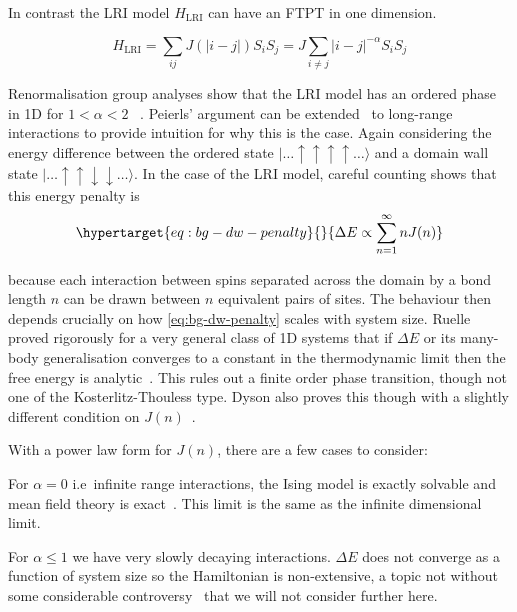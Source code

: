 In contrast the LRI model \(H_{\mathrm{LRI}}\) can have an FTPT in one dimension.

\[H_{\mathrm{LRI}} = \sum_{ij} J(|i-j|) S_i S_j = J \sum_{i\neq j} |i - j|^{-\alpha} S_i S_j\]

Renormalisation group analyses show that the LRI model has an ordered phase in 1D for \(1 < \alpha < 2\) ~\autocite{dysonExistencePhasetransitionOnedimensional1969}. Peierls' argument can be extended~\autocite{thoulessLongRangeOrderOneDimensional1969} to long-range interactions to provide intuition for why this is the case. Again considering the energy difference between the ordered state \(|\ldots\uparrow\uparrow\uparrow\uparrow\ldots\rangle\) and a domain wall state \(|\ldots\uparrow\uparrow\downarrow\downarrow\ldots\rangle\). In the case of the LRI model, careful counting shows that this energy penalty is \begin{equation}\protect\hypertarget{eq:bg-dw-penalty}{}{\Delta E \propto \sum_{n=1}^{\infty} n J(n)}\label{eq:bg-dw-penalty}\end{equation}

because each interaction between spins separated across the domain by a bond length \(n\) can be drawn between \(n\) equivalent pairs of sites. The behaviour then depends crucially on how \cref{eq:bg-dw-penalty} scales with system size. Ruelle proved rigorously for a very general class of 1D systems that if \(\Delta E\) or its many-body generalisation converges to a constant in the thermodynamic limit then the free energy is analytic~\autocite{ruelleStatisticalMechanicsOnedimensional1968}. This rules out a finite order phase transition, though not one of the Kosterlitz-Thouless type. Dyson also proves this though with a slightly different condition on \(J(n)\)~\autocite{dysonExistencePhasetransitionOnedimensional1969}.

With a power law form for \(J(n)\), there are a few cases to consider:

For \(\alpha = 0\) i.e~infinite range interactions, the Ising model is exactly solvable and mean field theory is exact~\autocite{lipkinValidityManybodyApproximation1965}. This limit is the same as the infinite dimensional limit.

For \(\alpha \leq 1\) we have very slowly decaying interactions. \(\Delta E\) does not converge as a function of system size so the Hamiltonian is non-extensive, a topic not without some considerable controversy~\autocite{grossNonextensiveHamiltonianSystems2002,lutskoQuestioningValidityNonextensive2011,wangCommentNonextensiveHamiltonian2003} that we will not consider further here.

